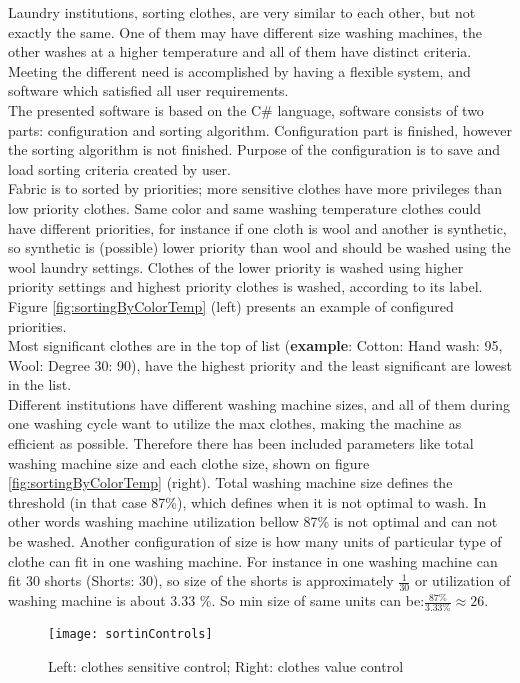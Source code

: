Laundry institutions, sorting clothes, are very similar to each other, but not exactly the same. One of them may have different size washing machines, the other washes at a higher temperature and all of them have distinct criteria.  Meeting the different need is accomplished by having a flexible system, and software which satisfied all user requirements. \\  The presented software is based on the C\# language, software consists of two parts: configuration and sorting algorithm. Configuration part is finished, however the sorting algorithm is not finished. Purpose of the configuration is to save and load sorting criteria created by user. 
\\
Fabric is to sorted by priorities; more sensitive clothes have more privileges than low priority clothes. Same color and same washing temperature clothes could have different priorities, for instance if one cloth is wool and another is synthetic, so synthetic is (possible) lower priority than wool and should be washed using the wool laundry settings. Clothes of the lower priority is washed using higher priority settings and highest priority clothes is washed, according to its label. Figure \ref{fig:sortingByColorTemp} (left) presents an example of configured priorities. \\ Most significant clothes are in the top of list (\textbf{example}: Cotton: Hand wash: 95, Wool: Degree 30: 90),  have the highest priority and the least significant are lowest in the list. 
\\
Different institutions have different washing machine sizes, and all of them during one washing cycle want to utilize the max clothes, making the machine as efficient as possible. Therefore there has been included parameters like total washing machine size and each clothe size, shown on figure \ref{fig:sortingByColorTemp} (right). Total washing machine size defines the threshold (in that case 87\%), which defines when it is not optimal to wash. In other words washing machine utilization bellow 87\% is not optimal and can not be washed. Another configuration of size is how many units of particular type of clothe can fit in one washing machine. For instance in one washing machine can fit 30 shorts (Shorts: 30), so size of the shorts is approximately $\frac{1}{30}$ or utilization of washing machine is about 3.33 \%. So min size of same units can be:$\frac{87\%}{3.33\%}\approx 26$. \\

\begin{figure}[h]
	\centering
		\texttt{[image: sortinControls]}
	\caption{Left: clothes sensitive control; Right: clothes value control}
	\label{fig:sortinControls}
\end{figure}

